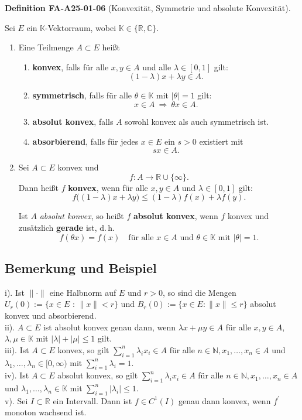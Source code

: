 \documentclass[10pt, letterpaper]{article}
\newcommand{\CustomHeading}[3]{%
  \par\medskip\noindent%
  \textbf{#1 #2} \textnormal{(#3)}.\enskip%
}
\newenvironment{DEF}[2]{\begin{unitbox}\CustomHeading{Definition}{#1}{#2}}{\end{unitbox}}
\begin{document}
\begin{DEF}{FA-A25-01-06}{Konvexität, Symmetrie und absolute Konvexität}
Sei $E$ ein $\mathbb{K}$-Vektorraum, wobei $\mathbb{K}\in\{\mathbb{R},\mathbb{C}\}$.

\begin{enumerate}
\item[(a)] Eine Teilmenge $A\subset E$ heißt
\begin{enumerate}
\item[(i)] \textbf{konvex}, falls für alle $x,y\in A$ und alle $\lambda\in[0,1]$ gilt:
\[
(1-\lambda)x+\lambda y \in A.
\]

\item[(ii)] \textbf{symmetrisch}, falls für alle $\theta\in\mathbb{K}$ mit $|\theta|=1$ gilt:
\[
x\in A \ \Longrightarrow\ \theta x\in A.
\]

\item[(iii)] \textbf{absolut konvex}, falls $A$ sowohl konvex als auch symmetrisch ist.

\item[(iv)] \textbf{absorbierend}, falls für jedes $x\in E$ ein $s>0$ existiert mit
\[
s x \in A.
\]
\end{enumerate}

\item[(b)] Sei $A\subset E$ konvex und
\[
f:A\longrightarrow\mathbb{R}\cup\{\infty\}.
\]
Dann heißt $f$ \textbf{konvex}, wenn für alle $x,y\in A$ und $\lambda\in[0,1]$ gilt:
\[
f\bigl((1-\lambda)x+\lambda y\bigr)\le (1-\lambda)f(x)+\lambda f(y).
\]

Ist $A$ \emph{absolut konvex}, so heißt $f$ \textbf{absolut konvex}, wenn $f$ konvex und zusätzlich \textbf{gerade} ist, d.\,h.
\[
f(\theta x)=f(x)\quad\text{für alle }x\in A\text{ und }\theta\in\mathbb{K}\text{ mit }|\theta|=1.
\]
\end{enumerate}
\end{DEF}




\subsection*{Bemerkung und Beispiel}
i). Ist $\|\cdot\|$ eine Halbnorm auf $E$ und $r>0$, so sind die Mengen $U_{r}(0):=\{x \in E$ : $\|x\|<r\}$ und $B_{r}(0):=\{x \in E:\|x\| \leq r\}$ absolut konvex und absorbierend.\\
ii). $A \subset E$ ist absolut konvex genau dann, wenn $\lambda x+\mu y \in A$ für alle $x, y \in A$, $\lambda, \mu \in \mathbb{K}$ mit $|\lambda|+|\mu| \leq 1$ gilt.\\
iii). Ist $A \subset E$ konvex, so gilt $\sum_{i=1}^{n} \lambda_{i} x_{i} \in A$ für alle $n \in \mathbb{N}, x_{1}, \ldots, x_{n} \in A$ und $\lambda_{1}, \ldots, \lambda_{n} \in[0, \infty)$ mit $\sum_{i=1}^{n} \lambda_{i}=1$.\\
iv). Ist $A \subset E$ absolut konvex, so gilt $\sum_{i=1}^{n} \lambda_{i} x_{i} \in A$ für alle $n \in \mathbb{N}, x_{1}, \ldots, x_{n} \in A$ und $\lambda_{1}, \ldots, \lambda_{n} \in \mathbb{K}$ mit $\sum_{i=1}^{n}\left|\lambda_{i}\right| \leq 1$.\\
v). Sei $I \subset \mathbb{R}$ ein Intervall. Dann ist $f \in C^{1}(I)$ genau dann konvex, wenn $f^{\prime}$ monoton wachsend ist.
\end{document}
